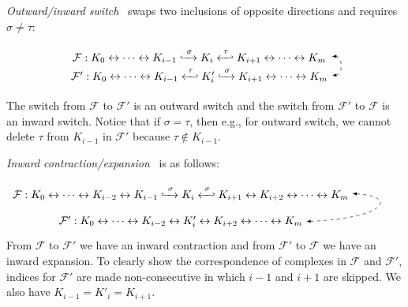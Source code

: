 \documentclass[letterpaper,11pt]{article}
\theoremstyle{mythmstyle}
\theoremstyle{mydefstyle}
\theoremstyle{plain}
\theoremstyle{definition}
\newcommand{\<}[1]{\langle #1\rangle}
\newcommand{\lbarrowspace}{\;}
\newcommand{\inctosp}[1]{\xhookrightarrow{\lbarrowspace#1\lbarrowspace}}
\newcommand{\bakinctosp}[1]{\xhookleftarrow{\lbarrowspace#1\lbarrowspace}}
\newcommand{\Fcal}{\mathcal{F}}
\newcommand{\sG}{\sigma}
\newcommand{\tG}{\tau}
\newcommand{\filtcnt}{m}
\begin{document}
\noindent
\textit{{Outward/inward switch}}~\cite{carlsson2010zigzag}
swaps two inclusions of opposite directions
and requires $\sG\neq\tG$:

\vspace{-0.5em}
\begin{equation}
\label{eqn:out-in-sw}
\begin{tikzpicture}[baseline=(current  bounding  box.center)]
\tikzstyle{every node}=[minimum width=24em]
\node (a) at (0,0) {$\Fcal: K_0 \leftrightarrow
\cdots
\leftrightarrow 
K_{i-1}\inctosp{\sG} 
K_i 
\bakinctosp{\tG} K_{i+1}
\leftrightarrow
\cdots \leftrightarrow K_\filtcnt$}; 
\node (b) at (0,-0.6){$\Fcal': K_0 \leftrightarrow
\cdots
\leftrightarrow 
K_{i-1}\bakinctosp{\tG} 
K'_i 
\inctosp{\sG} K_{i+1}
\leftrightarrow
\cdots \leftrightarrow K_\filtcnt$};
\path[->] (a.0) edge [bend left=90,looseness=1.5,arrows={latex-latex},dashed] (b.0);
\end{tikzpicture}
\end{equation}

\noindent
The switch from $\Fcal$ to $\Fcal'$ is 
an {{outward}} 
switch
and the switch from $\Fcal'$ to $\Fcal$ is  an {{inward}} switch.
Notice that if $\sG=\tG$, then e.g., for outward switch, we cannot delete $\tG$ from $K_{i-1}$ in $\Fcal'$
because $\tG\not\in K_{i-1}$.












\medskip
\noindent
\textit{{Inward contraction/expansion}}~\cite{maria2014zigzag}
is as follows:

\vspace{-0.5em}
\begin{equation}
\label{eqn:in-contrac-expan}
\begin{tikzpicture}[baseline=(current  bounding  box.center)]
\node (a) at (0,0) {$\Fcal: K_0 \leftrightarrow
\cdots\leftrightarrow K_{i-2}
\leftrightarrow 
K_{i-1}\inctosp{\sG} 
K_i 
\bakinctosp{\sG} K_{i+1}
\leftrightarrow K_{i+2}\leftrightarrow
\cdots \leftrightarrow K_\filtcnt$}; 
\node (b) at (0,-0.9){$\Fcal': K_0 \leftrightarrow
\cdots\leftrightarrow K_{i-2}
\leftrightarrow 
K'_{i}
\leftrightarrow K_{i+2}\leftrightarrow
\cdots \leftrightarrow K_\filtcnt$};
\draw[->,arrows={latex-latex},dashed] (a.0) .. controls (+7,-0.1) and (+6.5,-0.8) .. (b.0);
\end{tikzpicture}
\end{equation}
\noindent
From $\Fcal$ to $\Fcal'$ we have an inward contraction 
and from $\Fcal'$ to $\Fcal$ we have an inward expansion.
To clearly show 
the correspondence of complexes in $\Fcal$ and $\Fcal'$, 
indices for $\Fcal'$ are made non-consecutive
in which $i-1$ and $i+1$ are skipped.
We also have $K_{i-1}=K'_{i}=K_{i+1}$.
\end{document}
